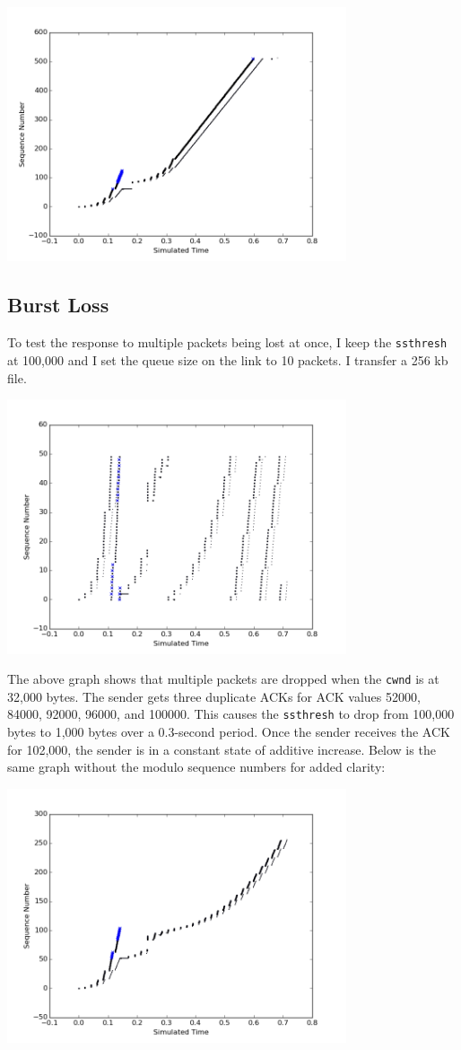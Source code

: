 \documentclass[11pt]{article}
\newcommand{\code}[1]{\texttt{#1}}
\begin{document}
\includegraphics[width=10cm]{../graphs/aimd_no_mod.png}

\pagebreak
\subsection{Burst Loss}
To test the response to multiple packets being lost at once, I keep the \code{ssthresh} at 100,000 and I set the queue size on the link to 10 packets. I transfer a 256 kb file.

\includegraphics[width=10cm]{../graphs/burst_loss_with_mod.png}

The above graph shows that multiple packets are dropped when the \code{cwnd} is at 32,000 bytes. The sender gets three duplicate ACKs for ACK values 52000, 84000, 92000, 96000, and 100000. This causes the \code{ssthresh} to drop from 100,000 bytes to 1,000 bytes over a 0.3-second period. Once the sender receives the ACK for 102,000, the sender is in a constant state of additive increase. Below is the same graph without the modulo sequence numbers for added clarity:

\includegraphics[width=10cm]{../graphs/burst_loss_no_mod.png}
\end{document}
